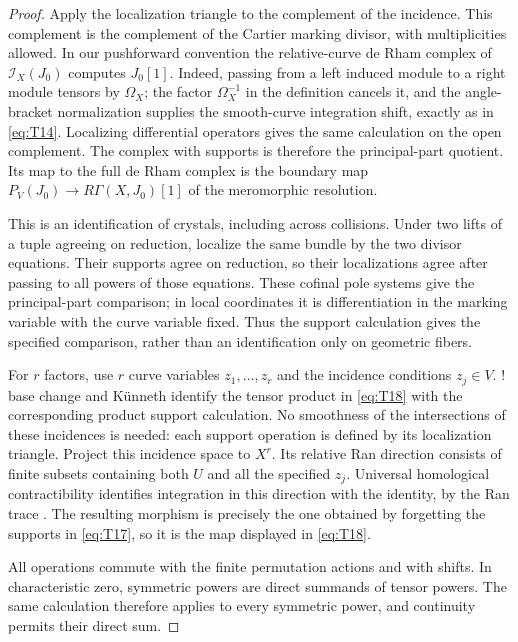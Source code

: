 \documentclass[11pt]{article}
\numberwithin{equation}{section}
\theoremstyle{definition}
\theoremstyle{remark}
\begin{document}
\begin{proof}
Apply the localization triangle to the complement of the incidence.  This
complement is the complement of the Cartier marking divisor, with
multiplicities allowed.  In our pushforward convention the relative-curve
de Rham complex of $\mathcal I_X(J_0)$ computes $J_0[1]$.  Indeed, passing
from a left induced module to a right module tensors by $\Omega_X$;
the factor $\Omega_X^{-1}$ in the definition cancels it, and the
angle-bracket normalization supplies the smooth-curve integration shift,
exactly as in \eqref{eq:T14}.  Localizing differential operators gives the
same calculation on the open complement.  The complex with supports is
therefore the principal-part quotient.  Its map to the full de Rham
complex is the boundary map
$P_V(J_0)\to R\Gamma(X,J_0)[1]$ of the meromorphic resolution.

This is an identification of crystals, including across collisions.
Under two lifts of a tuple agreeing on reduction, localize the same
bundle by the two divisor equations.  Their supports agree on reduction,
so their localizations agree after passing to all powers of those
equations.  These cofinal pole systems give the principal-part comparison;
in local coordinates it is differentiation in the marking variable with
the curve variable fixed.  Thus the support calculation gives the
specified comparison, rather than an identification only on geometric
fibers.

For $r$ factors, use $r$ curve variables $z_1,\ldots,z_r$ and the incidence
conditions $z_j\in V$.  ! base change and K\"unneth identify the tensor
product in \eqref{eq:T18} with the corresponding product support
calculation.  No smoothness of the intersections of these incidences is
needed: each support operation is defined by its localization triangle.
Project this incidence space to $X^r$.  Its relative Ran direction consists
of finite subsets containing both $U$ and all the specified $z_j$.
Universal homological contractibility identifies integration in this
direction with the identity, by the Ran trace
\cite[Theorem~1.6.5, Section~2.5.12, and Corollary~2.5.13]
{GaitsgoryContractibility}.  The resulting morphism is precisely the
one obtained by forgetting the supports in \eqref{eq:T17}, so it is the
map displayed in \eqref{eq:T18}.

All operations commute with the finite permutation actions and with
shifts.  In characteristic zero, symmetric powers are direct summands of
tensor powers.  The same calculation therefore applies to every symmetric
power, and continuity permits their direct sum.
\end{proof}
\end{document}
